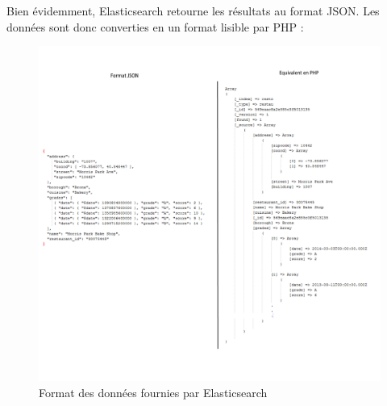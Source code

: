 \newpage
Bien évidemment, Elasticsearch retourne les résultats au format JSON. Les données sont donc converties en un format lisible par PHP :

\begin{figure}[H]
        \centering
        \includegraphics[width=\textwidth]{figure/dataJSONPHP.png}
            \caption{Format des données fournies par Elasticsearch}
            \label{fig:datajsonPhp}
\end{figure}
